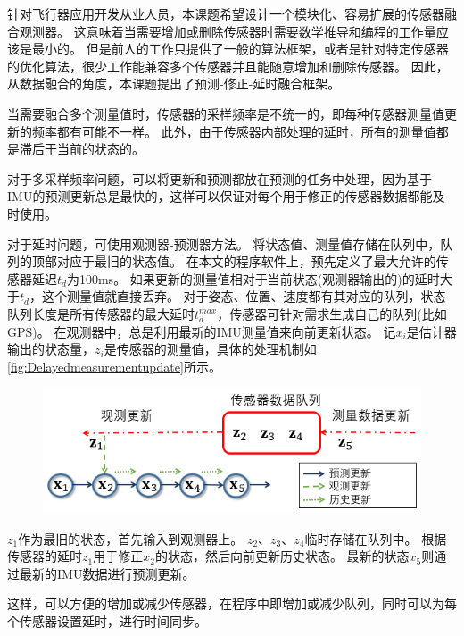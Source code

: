 \documentclass[
  type=master
]{gdutthesis}
\begin{document}
针对飞行器应用开发从业人员，本课题希望设计一个模块化、容易扩展的传感器融合观测器。
这意味着当需要增加或删除传感器时需要数学推导和编程的工作量应该是最小的。
但是前人的工作只提供了一般的算法框架，或者是针对特定传感器的优化算法，很少工作能兼容多个传感器并且能随意增加和删除传感器。
因此，从数据融合的角度，本课题提出了预测-修正-延时融合框架。

当需要融合多个测量值时，传感器的采样频率是不统一的，即每种传感器测量值更新的频率都有可能不一样。
此外，由于传感器内部处理的延时，所有的测量值都是滞后于当前的状态的。

对于多采样频率问题，可以将更新和预测都放在预测的任务中处理，因为基于IMU的预测更新总是最快的，这样可以保证对每个用于修正的传感器数据都能及时使用。

对于延时问题，可使用观测器-预测器方法\cite{khosravian2014velocity}。
将状态值、测量值存储在队列中，队列的顶部对应于最旧的状态值。
在本文的程序软件上，预先定义了最大允许的传感器延迟$t_d$为100ms。
如果更新的测量值相对于当前状态(观测器输出的)的延时大于$t_d$，这个测量值就直接丢弃。
对于姿态、位置、速度都有其对应的队列，状态队列长度是所有传感器的最大延时$t_d^{max}$，传感器可针对需求生成自己的队列(比如GPS)。
在观测器中，总是利用最新的IMU测量值来向前更新状态。
记$x_i$是估计器输出的状态量，$z_i$是传感器的测量值，具体的处理机制如\autoref{fig:Delayedmeasurementupdate}所示。
\begin{figure}[htbp]
	\centering
	\includegraphics[width=1.0\textwidth]{屏幕截图 2022-05-07 170504.png}
	\label{fig:Delayedmeasurementupdate}
\end{figure} 

$z_1$作为最旧的状态，首先输入到观测器上。
$z_2$、$z_3$、$z_4$临时存储在队列中。
根据传感器的延时$z_1$用于修正$x_2$的状态，然后向前更新历史状态。
最新的状态$x_5$则通过最新的IMU数据进行预测更新。

这样，可以方便的增加或减少传感器，在程序中即增加或减少队列，同时可以为每个传感器设置延时，进行时间同步。
\end{document}
